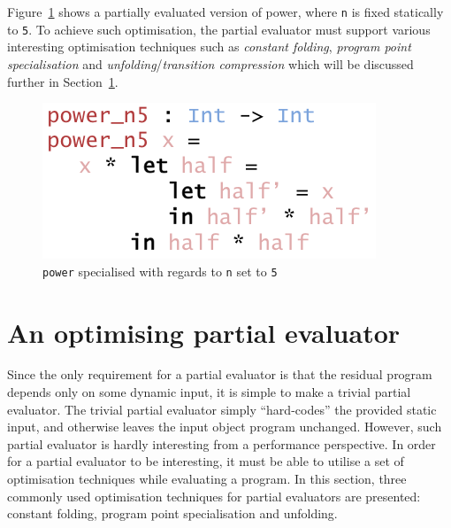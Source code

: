 \documentclass{ituthesis}
\newcommand{\ttdec}[1]{\textcolor{declared-var-color}{\texttt{#1}}}
\newcommand{\ttvar}[1]{\textcolor{local-var-color}{\texttt{#1}}}
\newcommand{\ttliteral}[1]{\textcolor{literal-color}{\texttt{#1}}}
\theoremstyle{break}
\begin{document}
Figure~\ref{fig:powspec} shows a partially evaluated version of power, where \ttvar{n} is fixed statically to \ttliteral{5}.
To achieve such optimisation, the partial evaluator must support various interesting optimisation techniques such as \textit{constant folding}, \textit{program point specialisation} and \textit{unfolding}/\textit{transition compression} \autocite{Jones:1993:PEA:153676} which will be discussed further in Section~\ref{sec:Anoptimisingpartialevaluator}.

\begin{figure}[ht]
\begin{center}
    \includegraphics[scale=0.5]{Figures/PowerSpecialised.png}
\end{center}
\caption{\ttdec{power} specialised with regards to \ttvar{n} set to \ttliteral{5}}
\label{fig:powspec}
\end{figure}

\section{An optimising partial evaluator}
\label{sec:Anoptimisingpartialevaluator}
Since the only requirement for a partial evaluator is that the residual program depends only on some dynamic input, it is simple to make a trivial partial evaluator.
The trivial partial evaluator simply ``hard-codes'' the provided static input, and otherwise leaves the input object program unchanged.
However, such partial evaluator is hardly interesting from a performance perspective.
In order for a partial evaluator to be interesting, it must be able to utilise a set of optimisation techniques while evaluating a program.
In this section, three commonly used optimisation techniques for partial evaluators are presented: constant folding, program point specialisation and unfolding.
\end{document}
